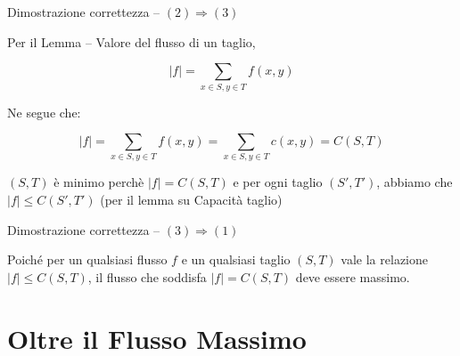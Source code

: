 \begin{frame}{Dimostrazione correttezza -- $(2) \Rightarrow (3)$}

\vspace{-9pt}

\BIL
\item Per il Lemma -- Valore del flusso di un taglio,

\[ 
  |f| = \sum_{x \in S, y \in T} f(x,y)
\]
\item Ne segue che:

\[ 
  |f| = \sum_{x \in S, y \in T} f(x,y) = \sum_{x \in S, y \in T} c(x,y) = C(S,T)
\]

\item $(S,T)$ è minimo perchè $|f|=C(S,T)$ e per ogni taglio $(S', T')$, abbiamo che $|f| \leq C(S', T')$ (per il lemma su Capacità taglio)

\EIL

\end{frame}

\begin{frame}{Dimostrazione correttezza -- $(3) \Rightarrow (1)$}

\vspace{-9pt}

\bigskip
Poiché per un qualsiasi flusso $f$ e un qualsiasi taglio $(S,T)$ vale la relazione $|f| \leq C(S,T)$, 
il flusso che soddisfa $|f| = C(S,T)$ deve essere massimo.

\end{frame}

\section{Oltre il Flusso Massimo}

